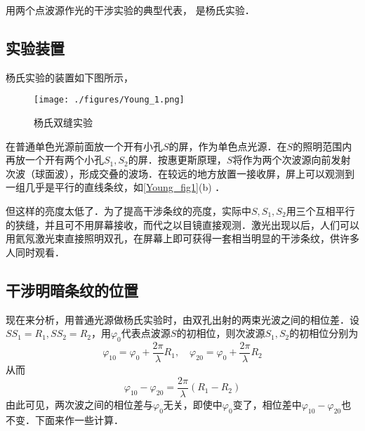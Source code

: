 

用两个点波源作光的干涉实验的典型代表， 是杨氏实验．
\subsection{实验装置}
杨氏实验的装置如下图所示，
\begin{figure}[ht]
\centering
\texttt{[image: ./figures/Young\_1.png]}
\caption{杨氏双缝实验} \label{Young_fig1}
\end{figure}
在普通单色光源前面放一个开有小孔$S$的屏，作为单色点光源．在$S $的照明范围内再放一个开有两个小孔$S_1,S_2$的屏．按惠更斯原理，$S$将作为两个次波源向前发射次波（球面波），形成交叠的波场．在较远的地方放置一接收屏，屏上可以观测到一组几乎是平行的直线条纹，如\autoref{Young_fig1}(b) ．

但这样的亮度太低了．为了提高干涉条纹的亮度，实际中$S,S_1,S_2$用三个互相平行的狭缝，并且可不用屏幕接收，而代之以目镜直接观测．激光出现以后，人们可以用氦氖激光束直接照明双孔，在屏幕上即可获得一套相当明显的干涉条纹，供许多人同时观看．

\subsection{干涉明暗条纹的位置}
现在来分析，用普通光源做杨氏实验时，由双孔出射的两束光波之间的相位差．设$SS_1=R_1,SS_2=R_2$，用$\varphi_0$代表点波源$S$的初相位，则次波源$S_1,S_2$的初相位分别为
\begin{equation}
\varphi_{10}=\varphi_{0}+\frac{2 \pi}{\lambda} R_{1}, \quad \varphi_{20}=\varphi_{0}+\frac{2 \pi}{\lambda} R_{2}
\end{equation}
从而
\begin{equation}
\varphi_{10}-\varphi_{20}=\frac{2 \pi}{\lambda}\left(R_{1}-R_{2}\right)
\end{equation}
由此可见，两次波之间的相位差与$\varphi_0$无关，即使中$\varphi_0$变了，相位差中$\varphi_{10}-\varphi_{20}$也不变．下面来作一些计算．

